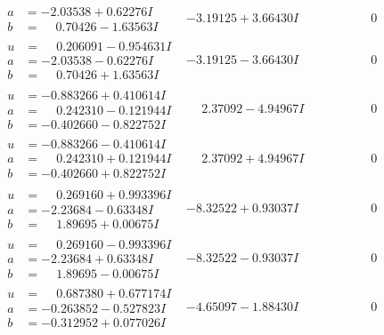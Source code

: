 \documentclass[1p]{elsarticle_modified}
\theoremstyle{definition}
\begin{document}
$$\begin{array}{c|c|c}
\begin{aligned}
a &= -2.03538 + 0.62276 I \\
b &= \phantom{-}0.70426 - 1.63563 I\end{aligned}
 & -3.19125 + 3.66430 I & \phantom{-0.000000 } 0 \\ \hline\begin{aligned}
u &= \phantom{-}0.206091 - 0.954631 I \\
a &= -2.03538 - 0.62276 I \\
b &= \phantom{-}0.70426 + 1.63563 I\end{aligned}
 & -3.19125 - 3.66430 I & \phantom{-0.000000 } 0 \\ \hline\begin{aligned}
u &= -0.883266 + 0.410614 I \\
a &= \phantom{-}0.242310 - 0.121944 I \\
b &= -0.402660 - 0.822752 I\end{aligned}
 & \phantom{-}2.37092 - 4.94967 I & \phantom{-0.000000 } 0 \\ \hline\begin{aligned}
u &= -0.883266 - 0.410614 I \\
a &= \phantom{-}0.242310 + 0.121944 I \\
b &= -0.402660 + 0.822752 I\end{aligned}
 & \phantom{-}2.37092 + 4.94967 I & \phantom{-0.000000 } 0 \\ \hline\begin{aligned}
u &= \phantom{-}0.269160 + 0.993396 I \\
a &= -2.23684 - 0.63348 I \\
b &= \phantom{-}1.89695 + 0.00675 I\end{aligned}
 & -8.32522 + 0.93037 I & \phantom{-0.000000 } 0 \\ \hline\begin{aligned}
u &= \phantom{-}0.269160 - 0.993396 I \\
a &= -2.23684 + 0.63348 I \\
b &= \phantom{-}1.89695 - 0.00675 I\end{aligned}
 & -8.32522 - 0.93037 I & \phantom{-0.000000 } 0 \\ \hline\begin{aligned}
u &= \phantom{-}0.687380 + 0.677174 I \\
a &= -0.263852 - 0.527823 I \\
b &= -0.312952 + 0.077026 I\end{aligned}
 & -4.65097 - 1.88430 I & \phantom{-0.000000 } 0 \\ \hline\begin{aligned}

\end{aligned}
\end{array}$$
\end{document}

